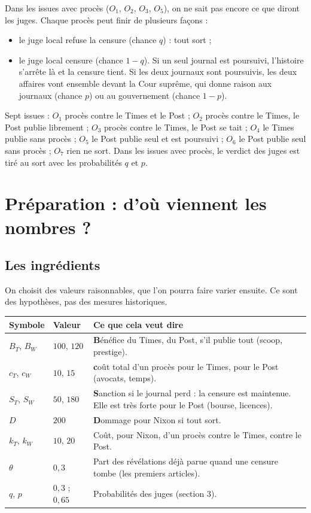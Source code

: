 \documentclass[11pt,a4paper]{article}
\theoremstyle{definition}
\begin{document}
Dans les issues avec procès ($O_1$, $O_2$, $O_3$, $O_5$), on ne sait pas encore ce que diront les juges. Chaque procès peut finir de plusieurs façons :
\begin{itemize}[leftmargin=*,itemsep=1pt]
\item le juge local refuse la censure (chance $q$) : tout sort ;
\item le juge local censure (chance $1-q$). Si un seul journal est poursuivi, l'histoire s'arrête là et la censure tient. Si les deux journaux sont poursuivis, les deux affaires vont ensemble devant la Cour suprême, qui donne raison aux journaux (chance $p$) ou au gouvernement (chance $1-p$).
\end{itemize}

\begin{reponse}
Sept issues : $O_1$ procès contre le Times et le Post ; $O_2$ procès contre le Times, le Post publie librement ; $O_3$ procès contre le Times, le Post se tait ; $O_4$ le Times publie sans procès ; $O_5$ le Post publie seul et est poursuivi ; $O_6$ le Post publie seul sans procès ; $O_7$ rien ne sort. Dans les issues avec procès, le verdict des juges est tiré au sort avec les probabilités $q$ et $p$.
\end{reponse}

\section{Préparation : d'où viennent les nombres ?}

\subsection{Les ingrédients}
On choisit des valeurs raisonnables, que l'on pourra faire varier ensuite. Ce sont des hypothèses, pas des mesures historiques.
\begin{center}
\small
\begin{tabular}{@{}llp{10cm}@{}}
\toprule
Symbole & Valeur & Ce que cela veut dire \\
\midrule
$B_T$, $B_W$ & $100$, $120$ & \textbf{B}énéfice du Times, du Post, s'il publie tout (scoop, prestige). \\
$c_T$, $c_W$ & $10$, $15$ & \textbf{c}oût total d'un procès pour le Times, pour le Post (avocats, temps). \\
$S_T$, $S_W$ & $50$, $180$ & \textbf{S}anction si le journal perd : la censure est maintenue. Elle est très forte pour le Post (bourse, licences). \\
$D$ & $200$ & \textbf{D}ommage pour Nixon si tout sort. \\
$k_T$, $k_W$ & $10$, $20$ & Coût, pour Nixon, d'un procès contre le Times, contre le Post. \\
$\theta$ & $0,3$ & Part des révélations déjà parue quand une censure tombe (les premiers articles). \\
$q$, $p$ & $0,3$ ; $0,65$ & Probabilités des juges (section 3). \\
\bottomrule
\end{tabular}
\end{center}
\end{document}
